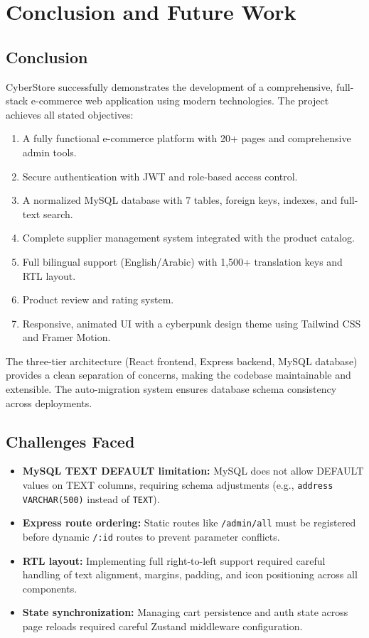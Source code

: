 \documentclass[12pt,a4paper]{report}
\begin{document}
\chapter{Conclusion and Future Work}

\section{Conclusion}
CyberStore successfully demonstrates the development of a comprehensive, full-stack e-commerce web application using modern technologies. The project achieves all stated objectives:

\begin{enumerate}[noitemsep]
  \item A fully functional e-commerce platform with 20+ pages and comprehensive admin tools.
  \item Secure authentication with JWT and role-based access control.
  \item A normalized MySQL database with 7 tables, foreign keys, indexes, and full-text search.
  \item Complete supplier management system integrated with the product catalog.
  \item Full bilingual support (English/Arabic) with 1,500+ translation keys and RTL layout.
  \item Product review and rating system.
  \item Responsive, animated UI with a cyberpunk design theme using Tailwind CSS and Framer Motion.
\end{enumerate}

The three-tier architecture (React frontend, Express backend, MySQL database) provides a clean separation of concerns, making the codebase maintainable and extensible. The auto-migration system ensures database schema consistency across deployments.

\section{Challenges Faced}
\begin{itemize}[noitemsep]
  \item \textbf{MySQL TEXT DEFAULT limitation:} MySQL does not allow DEFAULT values on TEXT columns, requiring schema adjustments (e.g., \texttt{address VARCHAR(500)} instead of \texttt{TEXT}).
  \item \textbf{Express route ordering:} Static routes like \texttt{/admin/all} must be registered before dynamic \texttt{/:id} routes to prevent parameter conflicts.
  \item \textbf{RTL layout:} Implementing full right-to-left support required careful handling of text alignment, margins, padding, and icon positioning across all components.
  \item \textbf{State synchronization:} Managing cart persistence and auth state across page reloads required careful Zustand middleware configuration.
\end{itemize}
\end{document}
